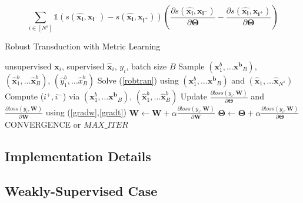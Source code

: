 \begin{small}
\begin{equation}
 \sum_{i \in [N^s]} \mathds{1}(s(\mathbf{\hat{x_i}},\mathbf{x_{i^-}}) - s(\mathbf{\hat{x_i}},\mathbf{x_{i^+}})) \left(\frac{\partial s(\mathbf{\hat{x_i}},\mathbf{x_{i^-}}) }{\partial \mathbf{\Theta}} - \frac{\partial s(\mathbf{\hat{x_i}},\mathbf{x_{i^+}}) }{\partial \mathbf{\Theta}} \right)
 \label{gradt}
\end{equation}
\end{small}


\begin{algorithm}[tb]
   \caption{Robust Transduction with Metric Learning}
   \label{alg:example}
\begin{algorithmic}
    unsupervised $\mathbf{x}_i$, supervised $\mathbf{\hat{x}}_i$, $y_i$, batch size $B$
   \REPEAT
   \STATE  Sample $(\mathbf{x}^b_1,\ldots \mathbf{x^b}_B)$, $(\mathbf{\hat{x}}^b_1,\ldots \mathbf{\hat{x}}^b_B)$, $(\hat{y}^b_1,\ldots \hat{x}^b_B)$
   \STATE Solve (\ref{robtran}) using $(\mathbf{x}^b_1,\ldots \mathbf{x^b}_B)$ and  $(\mathbf{\hat{x}}_1,\ldots \mathbf{\hat{x}}_{N^s})$
   \STATE Compute ($i^+, i^-$) via $(\mathbf{x}^b_1,\ldots \mathbf{x^b}_B)$, $(\mathbf{\hat{x}}^b_1,\ldots \mathbf{\hat{x}}^b_B)$ 
   \STATE Update $\frac{\partial loss (y_i, \mathbf{W})}{\partial \mathbf{\Theta}}$ and  $\frac{\partial loss (y_i, \mathbf{W})}{\partial \mathbf{W}} $ using (\ref{gradw},\ref{gradt})
   \ENDIF
   \ENDFOR
   \STATE $\mathbf{W} \leftarrow \mathbf{W} + \alpha \frac{\partial loss (y_i, \mathbf{W})}{\partial \mathbf{W}}$ 
   \STATE $\mathbf{\Theta} \leftarrow \mathbf{\Theta} + \alpha \frac{\partial loss (y_i, \mathbf{W})}{\partial \mathbf{\Theta}}$
   \UNTIL CONVERGENCE or $MAX\_ITER$
\end{algorithmic}
\end{algorithm}

\subsection{Implementation Details}

\subsection{Weakly-Supervised Case}
